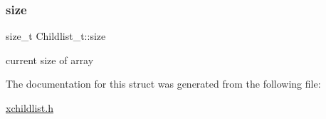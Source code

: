 \subsubsection{\texorpdfstring{size}{size}}
{\footnotesize\ttfamily size\+\_\+t Childlist\+\_\+t\+::size}

current size of array 

The documentation for this struct was generated from the following file\+:\begin{DoxyCompactItemize}
\item 
\hyperlink{xchildlist_8h}{xchildlist.\+h}\end{DoxyCompactItemize}
